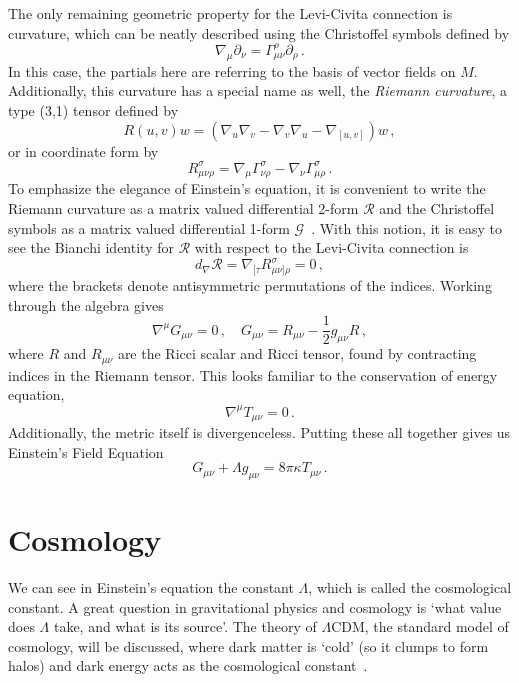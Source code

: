 The only remaining geometric property for the Levi-Civita connection is curvature, which can be neatly described using the Christoffel symbols defined by
\begin{equation}
    \nabla_\mu\partial_\nu = \Gamma^{\rho}_{\mu\nu}\partial_\rho\,.
\end{equation}
In this case, the partials here are referring to the basis of vector fields on $M$. Additionally, this curvature has a special name as well, the \textit{Riemann curvature}, a type (3,1) tensor defined by
\begin{equation}
    R(u,v)w = (\nabla_u\nabla_v-\nabla_v\nabla_u - \nabla_{[u,v]})w\,,
\end{equation}
or in coordinate form by
\begin{equation}
    R_{\mu\nu\rho}^\sigma  = \nabla_\mu \Gamma^\sigma_{\nu\rho} - \nabla_\nu\Gamma^{\sigma}_{\mu\rho}\,.
\end{equation}
To emphasize the elegance of Einstein's equation, it is convenient to write the Riemann curvature as a matrix valued differential 2-form $\mathcal{R}$ and the Christoffel symbols as a matrix valued differential 1-form $\mathcal{G}$~\cite{baez_john_gauge_1994}. With this notion, it is easy to see the Bianchi identity for $\mathcal{R}$ with respect to the Levi-Civita connection is
\begin{equation}
    d_{\nabla}\mathcal{R} = \nabla_{[\tau}R^\sigma_{\mu\nu]\rho} = 0\,,
\end{equation}
where the brackets denote antisymmetric permutations of the indices. Working through the algebra gives
\begin{equation}
    \nabla^\mu G_{\mu\nu} = 0\,,\quad G_{\mu\nu} = R_{\mu\nu}-\frac{1}{2}g_{\mu\nu}R\,,
\end{equation}
where $R$ and $R_{\mu\nu}$ are the Ricci scalar and Ricci tensor, found by contracting indices in the Riemann tensor. This looks familiar to the conservation of energy equation,
\begin{equation}
    \nabla^\mu T_{\mu\nu}=0\,.
\end{equation}
Additionally, the metric itself is divergenceless. Putting these all together gives us Einstein's Field Equation
\begin{equation}
    G_{\mu\nu} + \Lambda g_{\mu\nu} = 8\pi\kappa T_{\mu\nu}\,.
\end{equation}

\section{Cosmology}
We can see in Einstein's equation the constant $\Lambda$, which is called the cosmological constant. A great question in gravitational physics and cosmology is `what value does $\Lambda$ take, and what is its source'. The theory of $\Lambda$CDM, the standard model of cosmology, will be discussed, where dark matter is `cold' (so it clumps to form halos) and dark energy acts as the cosmological constant~\cite{scott_dodelson_modern_2021}.

